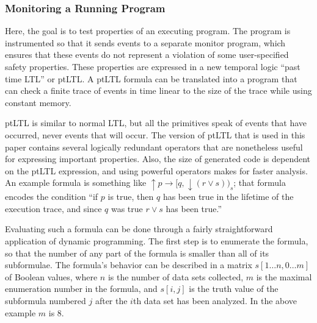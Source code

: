 \documentclass{article}
\begin{document}
\begin{multicols}{2}
\subsubsection{Monitoring a Running Program~\cite{694486}}

Here, the goal is to test properties of an executing program.  The
program is instrumented so that it sends events to a separate monitor
program, which ensures that these events do not represent a violation
of some user-specified safety properties.  These properties are
expressed in a new temporal logic ``past time LTL'' or ptLTL.  A ptLTL
formula can be translated into a program that can check a finite trace
of events in time linear to the size of the trace while using constant
memory.

ptLTL is similar to normal LTL, but all the primitives speak of events
that have occurred, never events that will occur.  The version of
ptLTL that is used in this paper contains several logically redundant
operators that are nonetheless useful for expressing important
properties.  Also, the size of generated code is dependent on the
ptLTL expression, and using powerful operators makes for faster
analysis.  An example formula is something like $ \uparrow p
\rightarrow [ q, \downarrow (r \vee s))_s$; that formula encodes the
condition ``if $p$ is true, then $q$ has been true in the lifetime of
the execution trace, and since $q$ was true $r \vee s$ has been
true.''

Evaluating such a formula can be done through a fairly straightforward
application of dynamic programming.  The first step is to enumerate
the formula, so that the number of any part of the formula is smaller
than all of its subformulae.  The formula's behavior can be described
in a matrix $s[1 \dots n, 0 \dots m]$ of Boolean values, where $n$ is
the number of data sets collected, $m$ is the maximal enumeration
number in the formula, and $s[i, j]$ is the truth value of the
subformula numbered $j$ after the $i$th data set has been analyzed.
In the above example $m$ is 8.


\end{multicols}
\end{document}

